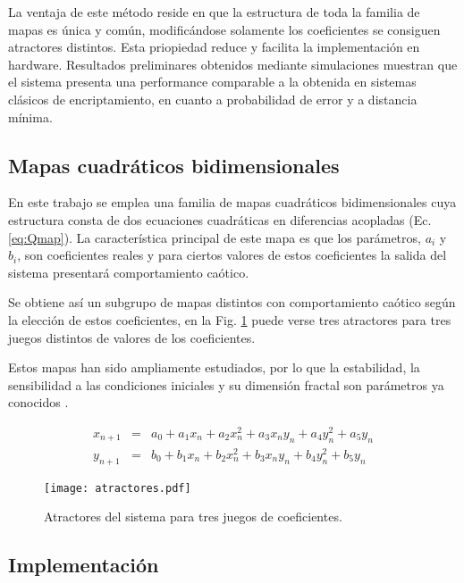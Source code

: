 La ventaja de este método reside en que la
estructura de toda la familia de mapas es única y común, modificándose
solamente los coeficientes se consiguen atractores distintos. Esta
priopiedad reduce y facilita la implementación en hardware.
Resultados preliminares obtenidos mediante simulaciones muestran
que el sistema presenta una performance comparable a la
obtenida en sistemas clásicos de encriptamiento, en cuanto a
probabilidad de error y a distancia mínima.


\subsection{Mapas cuadráticos bidimensionales}


En este trabajo se emplea una familia de mapas cuadráticos
bidimensionales cuya estructura consta de dos ecuaciones
cuadráticas en diferencias acopladas (Ec.\ref{eq:Qmap}). La
característica principal de este mapa es que los parámetros, $a_i$
y $b_i$, son coeficientes reales y para ciertos valores de estos
coeficientes la salida del sistema presentará comportamiento
caótico.

Se obtiene así un subgrupo de mapas distintos con comportamiento
caótico según la elección de estos coeficientes, en la Fig.
\ref{fig:atractores} puede verse tres atractores para tres juegos
distintos de valores de los coeficientes.

Estos mapas han sido ampliamente estudiados, por lo que la
estabilidad, la sensibilidad a las condiciones iniciales y su
dimensión fractal son parámetros ya conocidos
\cite{Sprott2003,Sprott2000}.

\begin{eqnarray}\label{eq:Qmap}
    x_{n+1}&=& a_0 + a_1 x_n + a_2 x_n^2 + a_3 x_n y_n + a_4 y_n^2 + a_5 y_n \nonumber\\
    y_{n+1}&=& b_0 + b_1 x_n + b_2 x_n^2 + b_3 x_n y_n + b_4 y_n^2 + b_5 y_n
\end{eqnarray}

\begin{figure}
    \centering
    \texttt{[image: atractores.pdf]}\\
    \caption{Atractores del sistema para tres juegos de coeficientes.}\label{fig:atractores}
\end{figure}

\subsection{Implementación}

